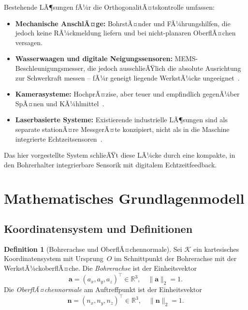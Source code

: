 ﻿\documentclass[a4paper,12pt]{article}
\theoremstyle{definition}
\newtheorem{definition}{Definition}
\begin{document}
Bestehende LÃ¶sungen fÃ¼r die OrthogonalitÃ¤tskontrolle umfassen:
\begin{itemize}
  \item \textbf{Mechanische AnschlÃ¤ge:} BohrstÃ¤nder und FÃ¼hrungshilfen, die
    jedoch keine RÃ¼ckmeldung liefern und bei nicht-planaren OberflÃ¤chen versagen.
  \item \textbf{Wasserwaagen und digitale Neigungssensoren:} MEMS-Beschleunigungs\-messer,
    die jedoch ausschlieÃŸlich die absolute Ausrichtung zur Schwerkraft messen --
    fÃ¼r geneigt liegende WerkstÃ¼cke ungeeignet~\cite{fraden2010handbook}.
  \item \textbf{Kamerasysteme:} HochprÃ¤zise, aber teuer und empfindlich gegenÃ¼ber
    SpÃ¤nen und KÃ¼hlmittel~\cite{jaehne2005digitale}.
  \item \textbf{Laserbasierte Systeme:} Existierende industrielle LÃ¶sungen sind
    als separate stationÃ¤re MessgerÃ¤te konzipiert, nicht als in die Ma\-schine
    integrierte Echtzeit\-sensoren~\cite{schwenke2008geometric}.
\end{itemize}

Das hier vorgestellte System schlieÃŸt diese LÃ¼cke durch eine kompakte,
in den Bohrerhalter integrierbare Sensorik mit digitalem Echtzeitfeedback.

\section{Mathematisches Grundlagenmodell}

\subsection{Koordinatensystem und Definitionen}

\begin{definition}[Bohrerachse und OberflÃ¤chennormale]
  Sei $\mathcal{K}$ ein kartesisches Koordinatensystem mit Ursprung~$O$ im
  Schnittpunkt der Bohrerachse mit der WerkstÃ¼ckoberflÃ¤che.
  Die \emph{Bohrerachse} ist der Einheitsvektor
  \[
    \mathbf{a} = (a_x, a_y, a_z)^\top \in \mathbb{R}^3, \quad \|\mathbf{a}\|_2 = 1.
  \]
  Die \emph{OberflÃ¤chennormale} am Auftreffpunkt ist der Einheitsvektor
  \[
    \mathbf{n} = (n_x, n_y, n_z)^\top \in \mathbb{R}^3, \quad \|\mathbf{n}\|_2 = 1.
  \]
\end{definition}
\end{document}

